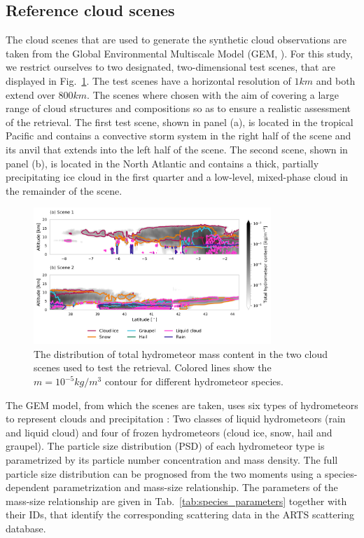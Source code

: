 \documentclass[journal abbreviation, manuscript]{copernicus}
\begin{document}
\subsection{Reference cloud scenes}

The cloud scenes that are used to generate the synthetic cloud observations are
taken from the Global Environmental Multiscale Model (GEM, \cite{cote98}). For
this study, we restrict ourselves to two designated, two-dimensional test
scenes, that are displayed in Fig.~\ref{fig:overview}. The test scenes have a
horizontal resolution of $1\unit{km}$ and both extend over $800\unit{km}$. The
scenes where chosen with the aim of covering a large range of cloud structures
and compositions so as to ensure a realistic assessment of the retrieval. The
first test scene, shown in panel (a), is located in the tropical Pacific and
contains a convective storm system in the right half of the scene and its anvil
that extends into the left half of the scene. The second scene, shown in panel
(b), is located in the North Atlantic and contains a thick, partially
precipitating ice cloud in the first quarter and a low-level, mixed-phase cloud
in the remainder of the scene.

\begin{figure}[h!]
\centering
\includegraphics[width = 0.8\textwidth]{../plots/scene_overview.png}
\caption{The distribution of total hydrometeor mass content in the two
cloud scenes used to test the retrieval. Colored lines show the
 $m = 10^{-5} \unit{kg/m^3}$ contour for different
 hydrometeor species.}
\label{fig:overview}
\end{figure}


The GEM model, from which the scenes are taken, uses six types of hydrometeors
to represent clouds and precipitation \citep{milbrandtyau05}: Two classes of
liquid hydrometeors (rain and liquid cloud) and four of frozen hydrometeors
(cloud ice, snow, hail and graupel). The particle size distribution (PSD) of
each hydrometeor type is parametrized by its particle number concentration and
mass density. The full particle size distribution can be prognosed from the two
moments using a species-dependent parametrization and mass-size relationship.
The parameters of the mass-size relationship are given in
Tab.~\ref{tab:species_parameters} together with their IDs, that identify the
corresponding scattering data in the ARTS scattering database.
\end{document}
